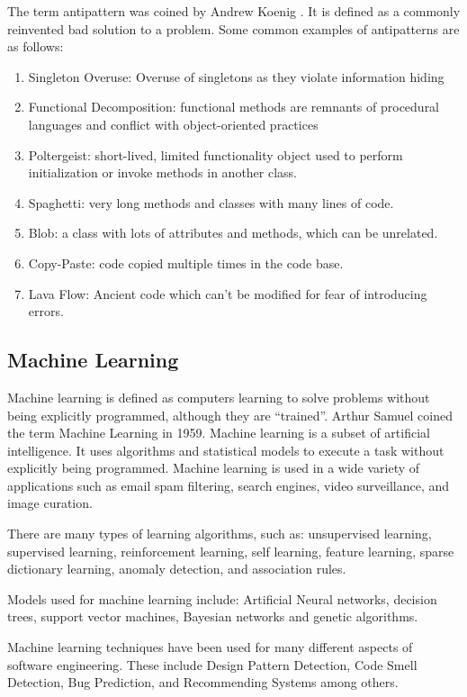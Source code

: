 \documentclass[conference]{IEEEtran}
\begin{document}
The term antipattern was coined by Andrew Koenig \cite{koenig_patterns_1998}. 
It is defined as a commonly reinvented bad solution to a problem.
Some common examples of antipatterns are as follows:
\begin{enumerate}
\item Singleton Overuse: Overuse of singletons as they violate information hiding
\item Functional Decomposition: functional methods are remnants of procedural languages and conflict with object-oriented practices
\item Poltergeist: short-lived, limited functionality object used to perform initialization or invoke methods in another class.
\item Spaghetti: very long methods and classes with many lines of code.
\item Blob: a class with lots of attributes and methods, which can be unrelated.
\item Copy-Paste: code copied multiple times in the code base.
\item Lava Flow: Ancient code which can't be modified for fear of introducing errors.
\end{enumerate}
\subsection{Machine Learning}
Machine learning is defined as computers learning to solve problems without being explicitly programmed, although they are ``trained''\cite{bishop_pattern_2006}. 
Arthur Samuel coined the term Machine Learning in 1959\cite{samuel_studies_1988}.
Machine learning is a subset of artificial intelligence. 
It uses algorithms and statistical models to execute a task without explicitly being programmed.
Machine learning is used in a wide variety of applications such as email spam filtering, search engines, video surveillance, and image curation.

There are many types of learning algorithms, such as: unsupervised learning, supervised learning, reinforcement learning, self learning, feature learning, sparse dictionary learning, anomaly detection, and association rules.

Models used for machine learning include: Artificial Neural networks, decision trees, support vector machines, Bayesian networks and genetic algorithms.

Machine learning techniques have been used for many different aspects of software engineering\cite{fontana_code_2017}. These include Design Pattern Detection, Code Smell Detection, Bug Prediction, and Recommending Systems among others.
\end{document}
